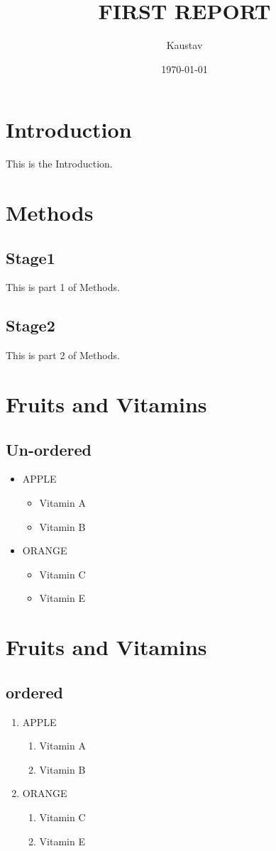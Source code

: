 \documentclass[a4 paper,12pt]{report}
\begin{document}
	\title{FIRST REPORT}
	\author{Kaustav}
	\date{\today}
	\maketitle
	\tableofcontents
	\newpage
	\section{Introduction}
	This is the Introduction.
	\newpage
	\section{Methods}
	\subsection{Stage1}
	This is part 1 of Methods.
	\subsection{Stage2}
	This is part 2 of Methods.
	
	\section{Fruits and Vitamins}
	\subsection{Un-ordered}
	\begin{itemize}
		\item APPLE
		\begin{itemize}
			\item {Vitamin A}
			\item {Vitamin B}
		\end{itemize}
		\item ORANGE
		\begin{itemize}
			\item {Vitamin C}
			\item {Vitamin E}
		\end{itemize}
	\end{itemize}
	
	\section{Fruits and Vitamins}
	\subsection{ordered}
	\begin{enumerate}
		\item APPLE
		\begin{enumerate}
			\item {Vitamin A}
			\item {Vitamin B}
		\end{enumerate}
		\item ORANGE
		\begin{enumerate}
			\item {Vitamin C}
			\item {Vitamin E}
		\end{enumerate}
	\end{enumerate}
	
\end{document}
